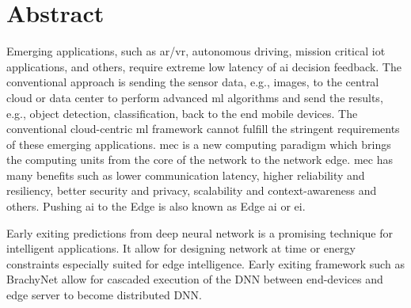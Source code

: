 
    \hypertarget{abstract}{%
    \chapter*{Abstract}\label{sec:abstract}}
    \textcolor{caption-color}{Emerging applications, such as \gls{ar}/\gls{vr}, autonomous driving, mission critical \gls{iot} applications, and others, require extreme low latency of \gls{ai} decision feedback. The conventional approach is sending the sensor data, e.g., images, to the central cloud or data center to perform advanced \gls{ml} algorithms and send the results, e.g., object detection, classification, back to the end mobile devices. The conventional cloud-centric \gls{ml} framework cannot fulfill the stringent requirements of these emerging applications. \gls{mec} is a new computing paradigm which brings the computing units from the core of the network to the network edge. \gls{mec} has many benefits such as lower communication latency, higher reliability and resiliency, better security and privacy, scalability and context-awareness and others. Pushing \gls{ai} to the Edge is also known as Edge \gls{ai} or \gls{ei}.}

	Early exiting predictions from deep neural network is a promising technique for intelligent applications. It allow for designing network at time or energy constraints especially suited for edge intelligence. Early exiting framework such as BrachyNet allow for cascaded  execution of the DNN between end-devices and edge server to become distributed DNN.  